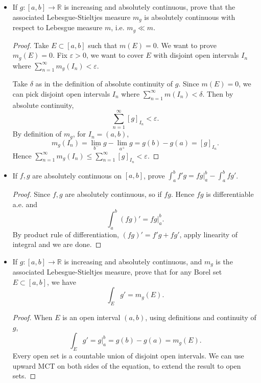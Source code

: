 \begin{itemize}
\begin{proof}
	For any partition of $A$, say $Q: x_0 < \ldots < x_n$, the partition can be viewed as finite union of disjoint intervals with total length less than $\delta$. Thus
	\[
		\sum_{i = 1}^n |F(x_i) - F(x_{i-1})| < \varepsilon
	.\] 
	If we take supremum over the partitions, we obtain
	\[
		\|\varphi\|_{TV(A)} \le \varepsilon
	.\] 
	By property of $\varphi$,
	\[
		\|\varphi\|_{TV([a,b])} = \sum_{A \in P}\|\varphi\|_{TV(A)} \le N \varepsilon
	.\] 
	where $N$ is the number of intervals in the partition $P$. We see that $N \varepsilon$ is finite, so $\varphi$ has bounded variation.
\end{proof}

	\item If $g:[a,b] \to \mathbb{R}$ is increasing and absolutely continuous, prove that the associated Lebesgue-Stieltjes measure $m_g$ is absolutely continuous with respect to Lebesgue measure $m$, i.e.  $m_g \ll m$.
\begin{proof}
	Take $E \subset [a,b]$ such that $m(E) = 0$. We want to prove $m_g(E) = 0$. Fix $\varepsilon>0$, we want to cover $E$ with disjoint open intervals $I_n$ where $\sum_{n = 1}^\infty  m_g(I_n) < \varepsilon$. 

	Take $\delta$ as in the definition of absolute continuity of $g$.
	Since $m(E) = 0$, we can pick disjoint open intervals $I_n$ where $\sum_{n = 1}^\infty  m(I_n) < \delta$. Then by absolute continuity,
	\[
		\sum_{n = 1}^{\infty } [g]_{I_n} < \varepsilon
	.\] 
	By definition of $m_g$, for $I_n = (a, b)$,
	\[
		m_g (I_n) = \lim_{b^-} g - \lim_{a^+} g = g(b) - g(a) = [g]_{I_n}
	.\] 
	Hence $\sum_{n = 1}^\infty  m_g(I_n) \le \sum_{n = 1}^\infty  [g]_{I_n} < \varepsilon$.
\end{proof}

	\item If $f, g$ are absolutely continuous on $[a,b]$, prove $\int _a^b f' g = f g|_a^b - \int _a^b fg'$.
\begin{proof}
	Since $f, g$ are absolutely continuous, so if $fg$. Hence $fg$ is differentiable a.e. and
	\[
		\int _a^b (fg)' = fg|_a^b
	.\] 
	By product rule of differentiation, $(fg)' = f'g + fg'$, apply linearity of integral and we are done.
\end{proof}

	\item If $g:[a,b] \to \mathbb{R}$ is increasing and absolutely continuous, and $m_g$ is the associated Lebesgue-Stieltjes measure, prove that for any Borel set $E \subset [a,b]$, we have
		\[
			\int _E g' = m_g (E)
		.\] 
\begin{proof}
	When $E$ is an open interval $(a,b)$, using definitions and continuity of $g$,
	\[
		\int _E g' = g|_a^b = g(b) - g(a) = m_g(E)
	.\] 
	Every open set is a countable union of disjoint open intervals. We can use upward MCT on both sides of the equation, to extend the result to open sets.


\end{proof}
\end{itemize}
